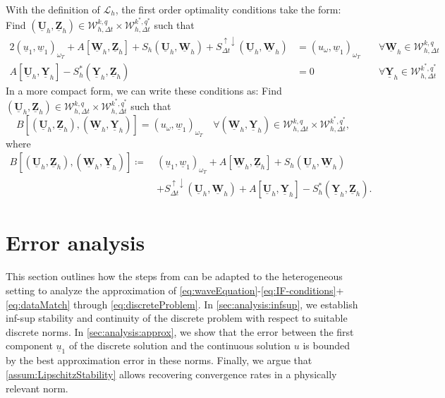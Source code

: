 \documentclass[sn-mathphys-num]{sn-jnl}
\numberwithin{equation}{section}
\newcommand{\cL}{\mathcal{L}}
\newcommand{\ProdFullyDiscrSpace}[2]{ \mathcal{W}^{ {#1},{#2}}_{h, \Delta t  } }
\newcommand{\Uh}{\underline{\mathbf{U}}_h}
\newcommand{\Yh}{\underline{\mathbf{Y}}_h}
\newcommand{\Zh}{\underline{\mathbf{Z}}_h}
\newcommand{\Wh}{\underline{\mathbf{W}}_h}
\newcommand{\ul}{\underline{u}}
\newcommand{\wl}{\underline{w}}
\newcommand{\Sud}{S^{\uparrow \downarrow}_{\Delta t}}
\begin{document}
 With the definition of $\cL_h$, the first order optimality conditions take the form: Find $(\Uh,\Zh) \in \ProdFullyDiscrSpace{k}{q} \times \ProdFullyDiscrSpace{k^\ast}{q^\ast}$ such that 
\begin{alignat*}{2}
    (\ul_1,\wl_1)_{\omega_T} \! + \! A[\Wh,\Zh] + S_h(\Uh,\Wh) + \Sud(\Uh,\Wh) &= (u_{\omega},\wl_1)_{\omega_T} \ &&\forall \Wh \in \ProdFullyDiscrSpace{k}{q} \\
    A[\Uh,\Yh] -  S_h^\ast(\Yh,\Zh) &= 0 \ &&\forall \Yh \in \ProdFullyDiscrSpace{k^\ast}{q^\ast} 
\end{alignat*}
In a more compact form, we can write these conditions as: Find $(\Uh,\Zh) \in \ProdFullyDiscrSpace{k}{q} \times \ProdFullyDiscrSpace{k^\ast}{q^\ast}$ such that
\begin{equation}\label{eq:discreteProblem}
    B[(\Uh,\Zh),(\Wh,\Yh)] = (u_{\omega},\wl_1)_{\omega_T} \quad \forall (\Wh,\Yh) \in \ProdFullyDiscrSpace{k}{q} \times \ProdFullyDiscrSpace{k^\ast}{q^\ast},
\end{equation}
where 
\begin{equation}
    \begin{aligned}
        B[(\Uh,\Zh),(\Wh,\Yh)] \coloneqq \ &(\ul_1,\wl_1)_{\omega_T} + A[\Wh,\Zh]+ S_h(\Uh,\Wh) \\
        &+  \Sud(\Uh,\Wh) + A[\Uh,\Yh] - S_h^\ast(\Yh,\Zh).
    \end{aligned}
\end{equation}

\section{Error analysis}
This section outlines how the steps from \cite{BP24} can be adapted to the heterogeneous setting to analyze the approximation of \eqref{eq:waveEquation}-\eqref{eq:IF-conditions}+\eqref{eq:dataMatch} through \eqref{eq:discreteProblem}. In \cref{sec:analysis:infsup}, we establish inf-sup stability and continuity of the discrete problem with respect to suitable discrete norms.
In \cref{sec:analysis:approx}, we show that the error between the first component $\ul_1$ of the discrete solution and the continuous solution $u$ is bounded by the best approximation error in these norms. Finally, we argue that \cref{assum:LipschitzStability} allows recovering convergence rates in a physically relevant norm.
\end{document}
